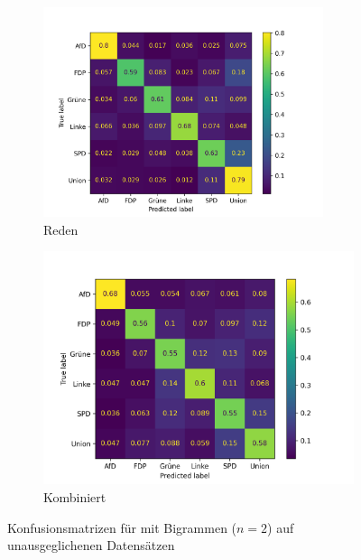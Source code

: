 \begin{figure}[H]
\begin{subfigure}{0.5\textwidth}
        \includegraphics[width=0.9\textwidth]{data/images/modeling/fasttext/none/speeches_confusion_matrix.png}
        \caption{Reden} \label{sfig:confusionMatrixFastTextSpeechesUnbalanced}
    \end{subfigure}
    \hfill
    \begin{subfigure}{0.49\textwidth}
        \includegraphics[width=\textwidth]{data/images/modeling/fasttext/none/all_confusion_matrix.png}
        \caption{Kombiniert} \label{sfig:confusionMatrixFastTextAllUnbalanced}
    \end{subfigure}
    \caption{Konfusionsmatrizen für \ft mit Bigrammen (\(n = \num{2}\)) auf unausgeglichenen Datensätzen} \label{fig:unbalancedConfusionMatrixFastText}
\end{figure}

